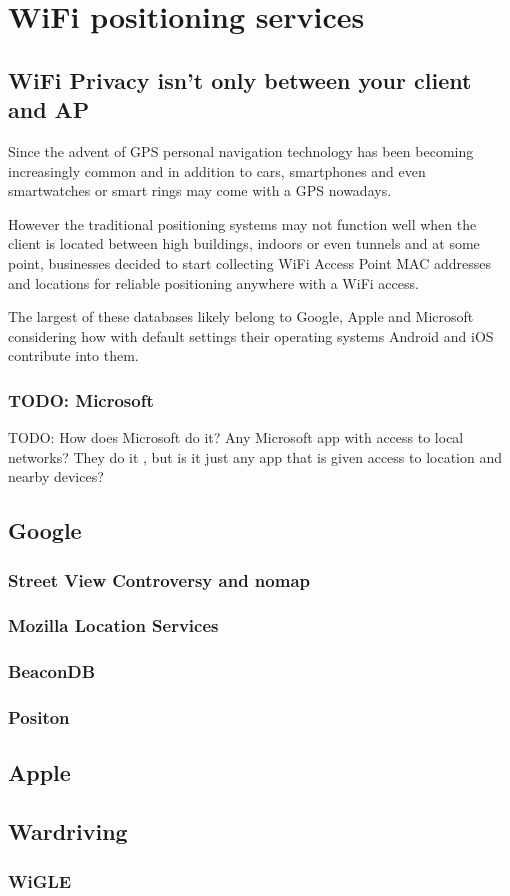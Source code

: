 \documentclass[../wifi-security.tex]{subfiles}
\begin{document}
\chapter{WiFi positioning services}

\section{WiFi Privacy isn't only between your client and AP}

Since the advent of GPS personal navigation technology has been becoming increasingly common and in addition to cars, smartphones and even smartwatches or smart rings may come with a GPS nowadays.

However the traditional positioning systems may not function well when the client is located between high buildings, indoors or even tunnels and at some point, businesses decided to start collecting WiFi Access Point MAC addresses and locations for reliable positioning anywhere with a WiFi access.

The largest of these databases likely belong to Google, Apple and Microsoft considering how with default settings their operating systems Android and iOS contribute into them.

\subsection{TODO: Microsoft}

TODO: How does Microsoft do it? Any Microsoft app with access to local networks? They do it \autocite{Microsoft_nomap}, but is it just any app that is given access to location and nearby devices?

\section{Google}

\subsection{Street View Controversy and nomap}

\subsection{Mozilla Location Services}

\subsection{BeaconDB}

\subsection{Positon}

\section{Apple}

\section{Wardriving}

\subsection{WiGLE}

\printbibliography[title={Chapter references}]
\end{document}
